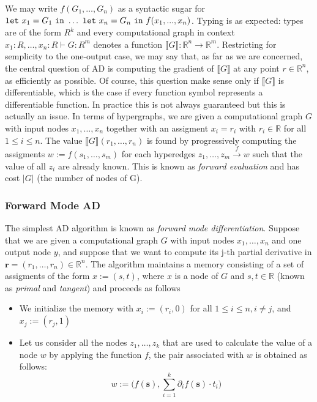 We may write $f(G_1,\dots,G_n)$ as a syntactic sugar for $\mathtt{let} \mbox{ } x_1 = G_1 \mbox{ } \mathtt{in} \mbox{ } \dots \mbox{ } \mathtt{let} \mbox{ } x_n = G_n \mbox{ } \mathtt{in}  \mbox{ } \\ f(x_1,...,x_n)$.  Typing is as expected: types are of the form $R^k$ and every computational graph in context $x_1:R, \dots, x_n:R \vdash G: R^m$ denotes a function $\llbracket G \rrbracket: \mathbb{R}^n \rightarrow \mathbb{R}^m$. Restricting for semplicity to the one-output case, we may say that, as far as we are concerned, the central question of AD is computing the gradient of $\llbracket G \rrbracket$ at any point $r \in \mathbb{R}^n$, as efficiently as possible. Of course, this question make sense only if $\llbracket G \rrbracket$ is differentiable, which is the case if every function symbol represents a differentiable function. In practice this is not always guaranteed but this is actually an issue. In terms of hypergraphs, we are given a computational graph $G$ with input nodes $x_1, \dots, x_n$ together with an assigment $x_i=r_i$ with $r_i \in \mathbb{R}$ for all $1 \leq i \leq n$. The value $\llbracket G \rrbracket (r_1, \dots, r_n)$ is found by progressively computing the assigments $w := f(s_1,\dots, s_m)$ for each hyperedges $z_1, \dots, z_m \xrightarrow{f} w$ such that the value of all $z_i$ are already known. This is known as \emph{forward evaluation} and has cost $|G|$ (the number of nodes of G).

\subsubsection{Forward Mode AD}
The simplest AD algorithm is known as \emph{forward mode differentiation}. Suppose that we are given a computational graph $G$ with input nodes $x_1, \dots, x_n$ and one output node $y$, and suppose that we want to compute its j-th partial derivative in $\mathbf{r}=(r_1,\dots,r_n)\in \mathbb{R}^n$. The algorithm maintains a memory consisting of a set of assigments of the form $x:=(s,t)$, where $x$ is a node of $G$ and $s,t \in \mathbb{R}$ (known as \emph{primal} and \emph{tangent}) and proceeds as follows

\begin{itemize}
	\item We initialize the memory with $x_i :=(r_i, 0)$ for all $1 \leq i \leq n, i \neq j$, and $x_j :=(r_j, 1)$

	\item Let us consider all the nodes $z_1, \dots, z_k $ that are used to calculate the value of a node $w$ by applying the function $f$, 			the pair associated with $w$ is obtained as follows:
	$$w:= \bigg(  f(\mathbf{s}) , \sum^k_{i=1} \partial_i f(\mathbf{s}) \cdot t_i \bigg)$$
\end{itemize}

